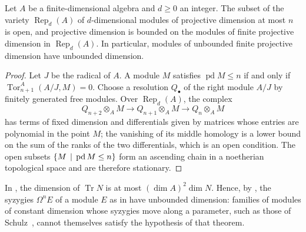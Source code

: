 \begin{proposition}
  \label{prop:bounded-dimension}
  Let $A$ be a finite-dimensional algebra and ${d\geq0}$ an integer. The
  subset of the variety $\operatorname{Rep}_d(A)$ of $d$-dimensional modules of
  projective dimension at most $n$ is open, and projective dimension is bounded
  on the modules of finite projective dimension in $\operatorname{Rep}_d(A)$.
  In particular, modules of unbounded finite projective dimension have unbounded
  dimension.
\end{proposition}

\begin{proof}
  Let $J$ be the radical of $A$. A module $M$ satisfies
  ${\operatorname{pd}M\leq n}$ if and only if
  ${\operatorname{Tor}^A_{n+1}(A/J,M)=0}$. Choose a resolution ${Q_\bullet}$ of the
  right module $A/J$ by finitely generated free modules. Over
  $\operatorname{Rep}_d(A)$, the complex
  \[
    Q_{n+2}\otimes_AM\longrightarrow Q_{n+1}\otimes_AM\longrightarrow
    Q_n\otimes_AM
  \]
  has terms of fixed dimension and differentials given by matrices whose entries
  are polynomial in the point $M$; the vanishing of its middle homology is a
  lower bound on the sum of the ranks of the two differentials, which is an open
  condition. The open subsets ${\set{M}[\operatorname{pd}M\leq n]}$ form an
  ascending chain in a noetherian topological space and are therefore
  stationary.
\end{proof}

In , the dimension of $\operatorname{Tr}N$ is at
most $(\dim A)^2\dim N$. Hence, by , the syzygies
$\Omega^nE$ of a module $E$ as in  have unbounded
dimension:
families of modules of constant dimension whose syzygies move along a
parameter, such as those of Schulz~\cite[Example~7]{Schu95}, cannot themselves
satisfy the hypothesis of that theorem.
